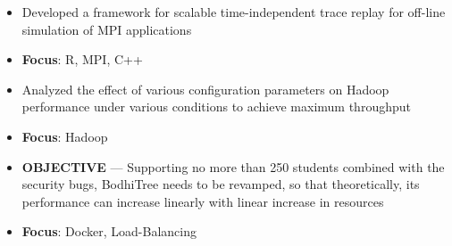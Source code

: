 \documentclass[10pt,a4paper]{altacv}
\begin{document}
\begin{itemize}
	\item Developed a framework for scalable time-independent trace replay for off-line simulation of MPI applications
	\item \textbf{Focus}: R, MPI, C++
\end{itemize}

\divider

\begin{itemize}
	\item Analyzed the effect of various configuration parameters on Hadoop performance under various conditions to achieve maximum throughput
	\item \textbf{Focus}: Hadoop
\end{itemize}

\begin{itemize}
	\item \textbf{OBJECTIVE} --- Supporting no more than 250 students combined with the security bugs, BodhiTree needs to be revamped, so that theoretically, its performance can increase linearly with linear increase in resources
	\item \textbf{Focus}: Docker, Load-Balancing
\end{itemize}
\end{document}
